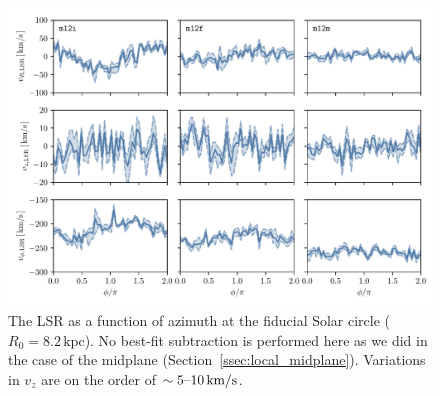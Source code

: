 \documentclass[twocolumn]{aastex62}
\newcommand{\kpc}{\text{kpc}}
\newcommand{\kms}{\text{km}/\text{s}}
\begin{document}
\begin{figure}[htb!]
\begin{center}
\includegraphics[width=\textwidth]{fig/lsr.pdf}
\end{center}
\caption{The LSR as a function of azimuth at the
fiducial Solar circle ($R_0 = 8.2\,\kpc$). No best-fit subtraction is
performed here as we did in the case of the midplane
(Section~\ref{ssec:local_midplane}). Variations in $v_z$ are on the order of
$\sim5\textup{--}10\,\kms$.}
\label{fig:lsr_variations}
\end{figure}


\end{document}
